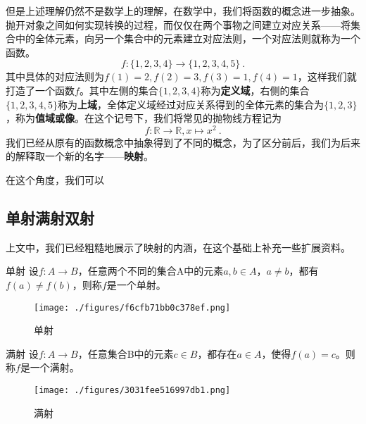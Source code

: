但是上述理解仍然不是数学上的理解，在数学中，我们将函数的概念进一步抽象。抛开对象之间如何实现转换的过程，而仅仅在两个事物之间建立对应关系——将集合中的全体元素，向另一个集合中的元素建立对应法则，一个对应法则就称为一个函数。
$$f:\{1,2,3,4\}\to\{1,2,3,4,5\}~.$$
其中具体的对应法则为$f(1)=2,f(2)=3,f(3)=1,f(4)=1$，这样我们就打造了一个函数$f$。其中左侧的集合$\{1,2,3,4\}$称为\textbf{定义域}，右侧的集合$\{1,2,3,4,5\}$称为\textbf{上域}，全体定义域经过对应关系得到的全体元素的集合为$\{1,2,3\}$，称为\textbf{值域或像}。在这个记号下，我们将常见的抛物线方程记为
\begin{equation}
f:\mathbb{R}\to{\mathbb{R}},x\mapsto{x^2}~.
\end{equation}
我们已经从原有的函数概念中抽象得到了不同的概念，为了区分前后，我们为后来的解释取一个新的名字——\textbf{映射}。

在这个角度，我们可以


\subsection{单射满射双射}

上文中，我们已经粗糙地展示了映射的内涵，在这个基础上补充一些扩展资料。

\begin{definition}{单射}
设$f:A\to{B}$，任意两个不同的集合A中的元素$a,b\in{A}$，$a\not={b}$，都有$f(a)\not={f(b)}$，则称$f$是一个单射。
\end{definition}

\begin{figure}[ht]
\centering
\texttt{[image: ./figures/f6cfb71bb0c378ef.png]}
\caption{单射}\label{fig_functi_2}
\end{figure}

\begin{definition}{满射}
设$f:A\to{B}$，任意集合B中的元素$c\in{B}$，都存在$a\in{A}$，使得$f(a)=c$。则称$f$是一个满射。
\end{definition}

\begin{figure}[ht]
\centering
\texttt{[image: ./figures/3031fee516997db1.png]}
\caption{满射} \label{fig_functi_3}
\end{figure}


